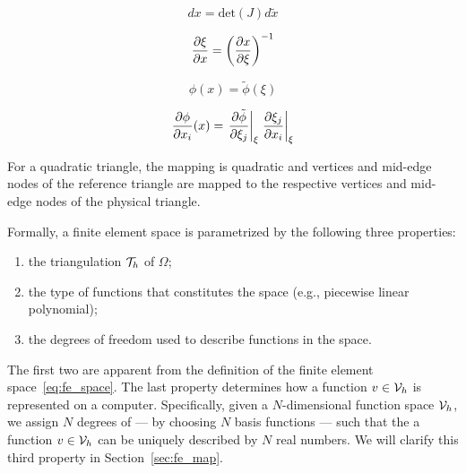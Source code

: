 \begin{equation*}
  dx = \text{det}(J) d\tilde x
\end{equation*}

\begin{equation*}
  \frac{\partial \xi}{\partial x} = \left( \frac{\partial x}{\partial \xi} \right)^{-1}
\end{equation*}

\begin{equation*}
  \phi(x) = \tilde \phi (\xi)
\end{equation*}

\begin{equation*}
  \frac{\partial \phi}{\partial x_i}(x) = \left. \frac{\partial \tilde \phi}{\partial \xi_j} \right|_\xi  \left. \frac{\partial \xi_j}{\partial x_i} \right|_\xi
\end{equation*}



For a quadratic triangle, the mapping is quadratic and vertices and mid-edge nodes of the reference triangle are mapped to the respective vertices and mid-edge nodes of the physical triangle.

Formally, a finite element space is parametrized by the following three properties:
\begin{enumerate}
\item the triangulation $\mathcal{T}_h$ of $\Omega$;
\item the type of functions that constitutes the space (e.g., piecewise linear polynomial);
\item the degrees of freedom used to describe functions in the space.
\end{enumerate}
The first two are apparent from the definition of the finite element space~\eqref{eq:fe_space}.  The last property determines how a function $v \in \mathcal{V}_h$ is represented on a computer.  Specifically, given a $N$-dimensional function space $\mathcal{V}_h$, we assign $N$ degrees of --- by choosing $N$ basis functions --- such that the a function $v \in \mathcal{V}_h$ can be uniquely described by $N$ real numbers.  We will clarify this third property in Section~\ref{sec:fe_map}.

